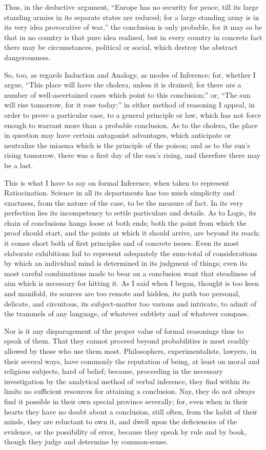 Thus, in the deductive argument, ``Europe has no security for
peace, till its large standing armies in its separate states are
reduced; for a large standing army is in its very idea provocative of
war,'' the conclusion is only probable, for it may so be that in
no country is that pure idea realized, but in every country in
concrete fact there may be circumstances, political or social, which
destroy the abstract dangerousness.

So, too, as regards Induction and Analogy, as modes of Inference;
for, whether I argue, ``This place will have the cholera, unless
it is drained; for there are a number of well-ascertained cases which
point to this conclusion;'' or, ``The sun will rise tomorrow,
for it rose today;'' in either method of reasoning I appeal, in
order to prove a particular case, to a general principle or law,
which has not force enough to warrant more than a probable conclusion.
As to the cholera, the place in question may have certain antagonist
advantages, which anticipate or neutralize the miasma which is the
principle of the poison; and as to the sun's rising tomorrow, there
was a first day of the sun's rising, and therefore there may be a
last.

This is what I have to say on formal Inference, when taken to
represent Ratiocination. Science in all its departments has too much
simplicity and exactness, from the nature of the case, to be the
measure of fact. In its very perfection lies its incompetency to
settle particulars and details. As to Logic, its chain of conclusions
hangs loose at both ends; both the point from which the proof should
start, and the points at which it should arrive, are beyond its reach;
it comes short both of first principles and of concrete issues. Even
its most elaborate exhibitions fail to represent adequately the
sum-total of considerations by which an individual mind is determined
in its judgment of things; even its most careful combinations made to
bear on a conclusion want that steadiness of aim which is necessary
for hitting it. As I said when I began, thought is too keen and
manifold, its sources are too remote and hidden, its path too
personal, delicate, and circuitous, its subject-matter too various and
intricate, to admit of the trammels of any language, of whatever
subtlety and of whatever compass.

Nor is it any disparagement of the proper value of formal
reasonings thus to speak of them. That they cannot proceed beyond
probabilities is most readily allowed by those who use them most.
Philosophers, experimentalists, lawyers, in their several ways, have
commonly the reputation of being, at least on moral and religious
subjects, hard of belief; because, proceeding in the necessary
investigation by the analytical method of verbal inference, they find
within its limits no sufficient resources for attaining a conclusion.
Nay, they do not always find it possible in their own special province
severally; for, even when in their hearts they have no doubt about a
conclusion, still often, from the habit of their minds, they are
reluctant to own it, and dwell upon the deficiencies of the evidence,
or the possibility of error, because they speak by rule and by book,
though they judge and determine by common-sense.

